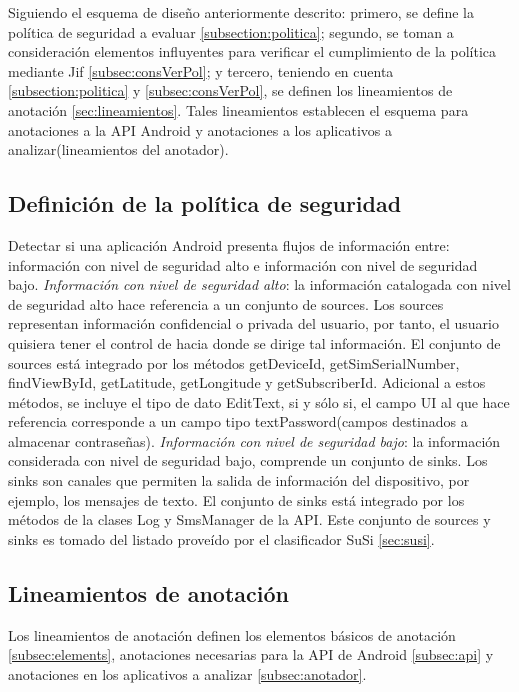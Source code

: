 Siguiendo el esquema de diseño anteriormente descrito: primero, se define la
política de seguridad a evaluar \ref{subsection:politica}; segundo, se toman a
consideración elementos influyentes para verificar el cumplimiento de la
política mediante Jif \ref{subsec:consVerPol}; y tercero, teniendo en cuenta
\ref{subsection:politica} y \ref{subsec:consVerPol}, se definen los lineamientos
de anotación \ref{sec:lineamientos}. Tales lineamientos establecen el esquema
para anotaciones a la API Android y anotaciones a los aplicativos a
analizar(lineamientos del anotador).

\subsection{Definición de la política de seguridad}
Detectar si una aplicación Android presenta flujos de información entre:
información con nivel de seguridad alto e información con nivel de seguridad bajo.\newline
\textit{Información con nivel de seguridad alto}: la información
catalogada con nivel de seguridad alto hace referencia a un conjunto de sources.
Los sources representan información confidencial o privada del usuario, por
tanto, el usuario quisiera tener el control de hacia donde se dirige tal
información.
El conjunto de sources está integrado por los métodos getDeviceId,
getSimSerialNumber, findViewById, getLatitude, getLongitude y getSubscriberId.
Adicional a estos métodos, se incluye el tipo de dato EditText, si y sólo si, el
campo UI al que hace referencia corresponde a un campo tipo textPassword(campos
destinados a almacenar contraseñas).\newline 
\textit{Información con nivel de seguridad bajo}: la
información considerada con nivel de seguridad bajo, comprende un conjunto
de sinks. Los sinks son canales que permiten la salida de información del
dispositivo, por ejemplo, los mensajes de texto. El conjunto de sinks
está integrado por los métodos de la clases Log y SmsManager de la API.\newline
Este conjunto de sources y sinks es tomado del listado proveído por el
clasificador SuSi \ref{sec:susi}.

\subsection{Lineamientos de anotación}
Los lineamientos de anotación definen los elementos básicos de anotación
\ref{subsec:elements}, anotaciones necesarias para la API de Android
\ref{subsec:api} y anotaciones en los aplicativos a analizar \ref{subsec:anotador}.

